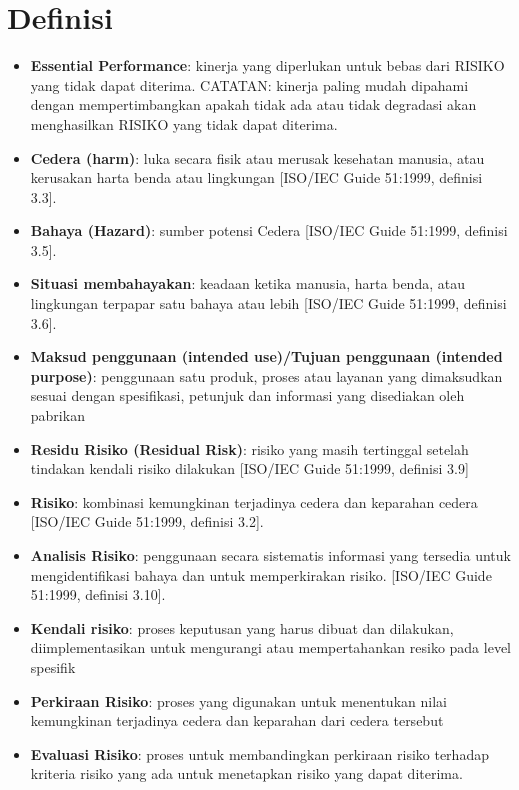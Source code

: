 \documentclass[11pt,a4paper,twoside,draft,onecolumn]{book}
\begin{document}
		\section{Definisi}
		\begin{itemize}
			\item \textbf{Essential Performance}: kinerja yang diperlukan untuk bebas dari RISIKO yang tidak dapat diterima.
			\linebreak
			CATATAN: kinerja paling mudah dipahami dengan mempertimbangkan apakah
			tidak ada atau tidak degradasi akan menghasilkan RISIKO yang tidak dapat
			diterima.
			\item \textbf{Cedera (harm)}: luka secara fisik atau merusak kesehatan manusia, atau kerusakan harta benda atau lingkungan [ISO/IEC Guide 51:1999, definisi 3.3].
			\item \textbf{Bahaya (Hazard)}: sumber potensi Cedera [ISO/IEC Guide 51:1999, definisi 3.5].
			\item \textbf{Situasi membahayakan}: keadaan ketika manusia, harta benda, atau lingkungan terpapar satu bahaya atau lebih [ISO/IEC Guide 51:1999, definisi 3.6].
			\item \textbf{Maksud penggunaan (intended use)/Tujuan penggunaan (intended purpose)}: penggunaan satu produk, proses atau layanan yang dimaksudkan sesuai dengan spesifikasi, petunjuk dan informasi yang disediakan oleh pabrikan
			\item \textbf{Residu Risiko (Residual Risk)}: risiko yang masih tertinggal setelah tindakan kendali risiko dilakukan [ISO/IEC Guide 51:1999, definisi 3.9]
			\item \textbf{Risiko}: kombinasi kemungkinan terjadinya cedera dan keparahan cedera [ISO/IEC Guide 51:1999, definisi 3.2].
			\item \textbf{Analisis Risiko}: penggunaan secara sistematis informasi yang tersedia untuk mengidentifikasi bahaya dan untuk memperkirakan risiko. [ISO/IEC Guide 51:1999, definisi 3.10].
			\item \textbf{Kendali risiko}: proses keputusan yang harus dibuat dan dilakukan, diimplementasikan untuk mengurangi atau mempertahankan resiko pada level spesifik
			\item \textbf{Perkiraan Risiko}: proses yang digunakan untuk menentukan nilai kemungkinan terjadinya cedera dan keparahan dari cedera tersebut
			\item \textbf{Evaluasi Risiko}: proses untuk membandingkan perkiraan risiko terhadap kriteria risiko yang ada untuk menetapkan risiko yang dapat diterima.
		\end{itemize}
	\newpage
	
\end{document}
